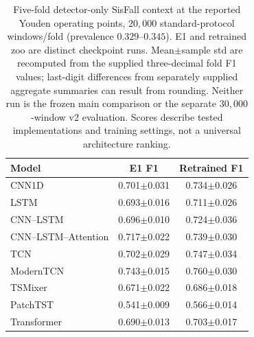 \begin{table}[!t]
\centering
\caption{Five-fold detector-only SisFall context at the reported Youden operating points, $20{,}000$ standard-protocol windows/fold (prevalence $0.329$--$0.345$). E1 and retrained zoo are distinct checkpoint runs. Mean$\pm$sample std are recomputed from the supplied three-decimal fold F1 values; last-digit differences from separately supplied aggregate summaries can result from rounding. Neither run is the frozen main comparison or the separate $30{,}000$-window v2 evaluation. Scores describe tested implementations and training settings, not a universal architecture ranking.}
\label{tab:backbone}
\begin{tabular}{lcc}
\toprule
Model & E1 F1 & Retrained F1 \\
\midrule
CNN1D & 0.701$\pm$0.031 & 0.734$\pm$0.026 \\
LSTM & 0.693$\pm$0.016 & 0.711$\pm$0.026 \\
CNN--LSTM & 0.696$\pm$0.010 & 0.724$\pm$0.036 \\
CNN--LSTM--Attention & 0.717$\pm$0.022 & 0.739$\pm$0.030 \\
TCN & 0.702$\pm$0.029 & 0.747$\pm$0.034 \\
ModernTCN & 0.743$\pm$0.015 & 0.760$\pm$0.030 \\
TSMixer & 0.671$\pm$0.022 & 0.686$\pm$0.018 \\
PatchTST & 0.541$\pm$0.009 & 0.566$\pm$0.014 \\
Transformer & 0.690$\pm$0.013 & 0.703$\pm$0.017 \\
\bottomrule
\end{tabular}
\end{table}
